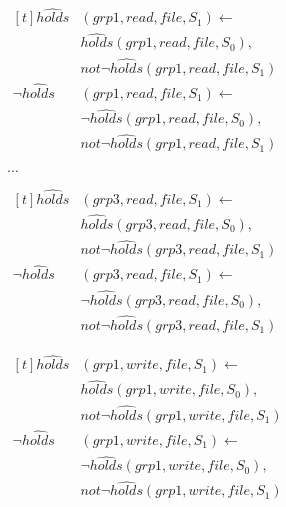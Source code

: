 \documentclass[global,twocolumn,draft]{svjour}
\newenvironment{vexample}
  {\begin{example}\hspace{0.25em}}
  {\end{example}}
\begin{document}
\begin{vexample}
\begin{enumerate}
              \begin{math}
                \begin{aligned}[t]
                  \hat{holds}&(grp1, read, file, S_{1}) \leftarrow \\
                  & \hat{holds}(grp1, read, file, S_{0}), \\
                  & not \lnot \hat{holds}(grp1, read, file, S_{1}) \\
                  \lnot \hat{holds}&(grp1, read, file, S_{1}) \leftarrow \\
                  & \lnot \hat{holds}(grp1, read, file, S_{0}), \\
                  & not \lnot \hat{holds}(grp1, read, file, S_{1})
                \end{aligned}
              \end{math}

              $\ldots$

              \begin{math}
                \begin{aligned}[t]
                  \hat{holds}&(grp3, read, file, S_{1}) \leftarrow \\
                  & \hat{holds}(grp3, read, file, S_{0}), \\
                  & not \lnot \hat{holds}(grp3, read, file, S_{1}) \\
                  \lnot \hat{holds}&(grp3, read, file, S_{1}) \leftarrow \\
                  & \lnot \hat{holds}(grp3, read, file, S_{0}), \\
                  & not \lnot \hat{holds}(grp3, read, file, S_{1})
                \end{aligned}
              \end{math}

              \begin{math}
                \begin{aligned}[t]
                  \hat{holds}&(grp1, write, file, S_{1}) \leftarrow \\
                  & \hat{holds}(grp1, write, file, S_{0}), \\
                  & not \lnot \hat{holds}(grp1, write, file, S_{1}) \\
                  \lnot \hat{holds}&(grp1, write, file, S_{1}) \leftarrow \\
                  & \lnot \hat{holds}(grp1, write, file, S_{0}), \\
                  & not \lnot \hat{holds}(grp1, write, file, S_{1})
                \end{aligned}
              \end{math}


\end{enumerate}
\end{vexample}
\end{document}
